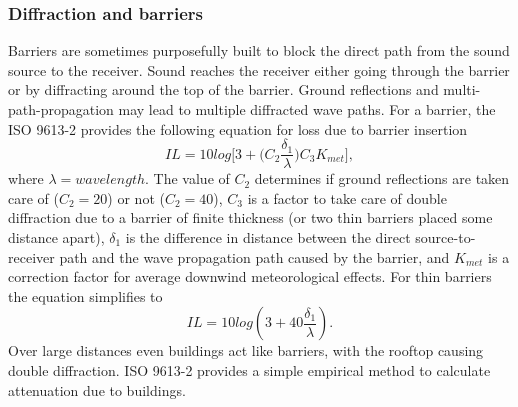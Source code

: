 \subsubsection{Diffraction and barriers}
Barriers are sometimes purposefully built to block the direct path from the sound source to the receiver. Sound reaches the receiver either going through the barrier or by diffracting around the top of the barrier. Ground reflections and multi-path-propagation may lead to multiple diffracted wave paths. For a barrier, the ISO 9613-2 \cite{ISO9613} provides the following equation for loss due to barrier insertion
\begin{equation}
    IL = 10log\bigg[3+\bigg(C_2\frac{\delta_1}{\lambda}\bigg)C_3K_{met}\bigg],
\end{equation}
where $\lambda=wavelength$. The value of $C_2$ determines if ground reflections are taken care of ($C_2 = 20$) or not ($C_2 = 40$), $C_3$ is a factor to take care of double diffraction due to a barrier of finite thickness (or two thin barriers placed some distance apart), $\delta_1$ is the difference in distance between the direct source-to-receiver path and the wave propagation path caused by the barrier, and $K_{met}$ is a correction factor for average downwind meteorological effects. For thin barriers the equation simplifies to 
\begin{equation}
    IL = 10log(3+40\frac{\delta_1}{\lambda}). 
\end{equation}
Over large distances even buildings act like barriers, with the rooftop causing double diffraction. ISO 9613-2 \cite{ISO9613} provides a simple empirical method to calculate attenuation due to buildings.
